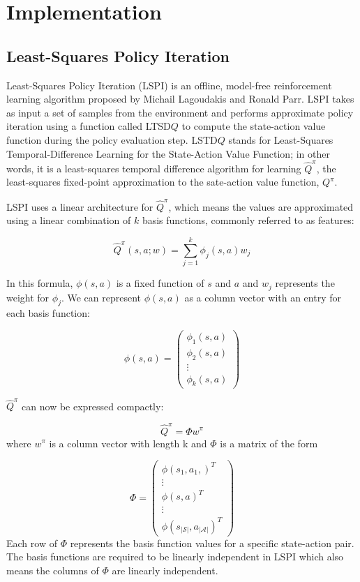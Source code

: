 \chapter{Implementation}

\section{Least-Squares Policy Iteration}

Least-Squares Policy Iteration (LSPI) is an offline, model-free reinforcement learning algorithm proposed by Michail Lagoudakis and Ronald Parr. LSPI takes as input a set of samples from the environment and performs approximate policy iteration using a function called LTSD$Q$ to compute the state-action value function during the policy evaluation step. LSTD$Q$ stands for Least-Squares Temporal-Difference Learning for the State-Action Value Function; in other words, it is a least-squares temporal difference algorithm for learning $\hat{Q}^\pi$, the least-squares fixed-point approximation to the sate-action value function, $Q^\pi$.

LSPI uses a linear architecture for $\hat{Q}^\pi$, which means the values are approximated using a linear combination of $k$ basis functions, commonly referred to as features:

\[
    \hat{Q}^\pi(s,a;w) = \sum_{j=1}^k \phi_j(s,a)w_j
\]

In this formula, $\phi(s,a)$ is a fixed function of $s$ and $a$ and $w_j$ represents the weight for $\phi_j$. We can represent $\phi(s,a)$ as a column vector with an entry for each basis function:


\[
    \phi(s,a) = \begin{pmatrix}
       \phi_1(s,a) \\ \phi_2(s,a) \\ \vdots \\ \phi_k(s,a)
    \end{pmatrix}
\]

$\hat{Q}^\pi$  can now be expressed compactly:

\[
    \hat{Q}^\pi = \Phi w^\pi
\]
where $w^\pi$ is a column vector with length k and $\Phi$ is a matrix of the form

\[
    \Phi = \begin{pmatrix}
        \phi(s_1,a_1,)^T \\ \vdots \\ \phi(s,a)^T \\ \vdots \\ \phi(s_{|\mathcal{S}|},a_{|\mathcal{A}|})^T
    \end{pmatrix}
\]
Each row of $\Phi$ represents the basis function values for a specific state-action pair. The basis functions are required to be linearly independent in LSPI which also means the columns of $\Phi$ are linearly independent.

